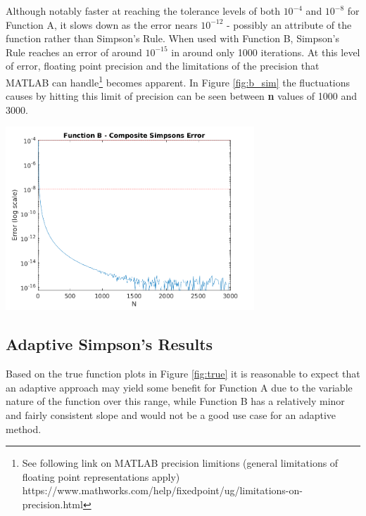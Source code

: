 \documentclass[a4paper]{article}
\begin{document}
Although notably faster at reaching the tolerance levels of both $10^{-4}$ and $10^{-8}$ for Function A, it slows down as the error nears $10^{-12}$ - possibly an attribute of the function rather than Simpson's Rule. When used with Function B, Simpson's Rule reaches an error of around $10^{-15}$ in around only 1000 iterations. At this level of error, floating point precision and the limitations of the precision that MATLAB can handle\footnote{See following link on MATLAB precision limitions (general limitations of floating point representations apply) https://www.mathworks.com/help/fixedpoint/ug/limitations-on-precision.html} becomes apparent. In Figure \ref{fig:b_sim} the fluctuations causes by hitting this limit of precision can be seen between \textbf{n} values of 1000 and 3000. 
 
\begin{center}
	\includegraphics[width=0.7\textwidth]{../output/b_simpsons.png}
	\label{fig:b_sim}
\end{center}



\subsection{Adaptive Simpson's Results}
\label{results:adaptive}

Based on the true function plots in Figure \ref{fig:true} it is reasonable to expect that an adaptive approach may yield some benefit for Function A due to the variable nature of the function over this range, while Function B has a relatively minor and fairly consistent slope and would not be a good use case for an adaptive method.
\end{document}
